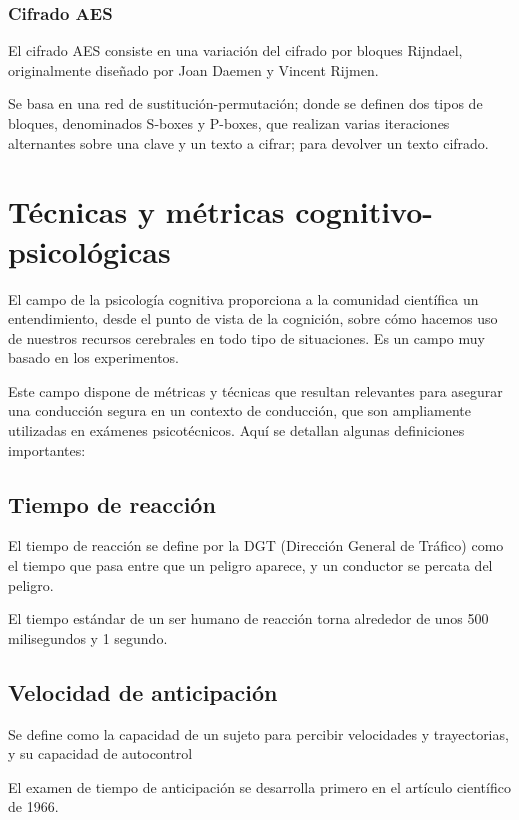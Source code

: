 \documentclass[12pt,a4paper,twoside,openright]{book}
\begin{document}
\subsubsection{Cifrado AES}

El cifrado AES consiste en una variación del cifrado por bloques Rijndael, originalmente diseñado por Joan Daemen y Vincent Rijmen.

Se basa en una red de sustitución-permutación; donde se definen dos tipos de bloques, denominados S-boxes y P-boxes, que realizan varias iteraciones alternantes sobre una clave y un texto a cifrar; para devolver un texto cifrado.

\section{Técnicas y métricas cognitivo-psicológicas}

El campo de la psicología cognitiva proporciona a la comunidad científica un entendimiento, desde el punto de vista de la cognición, sobre cómo hacemos uso de nuestros recursos cerebrales en todo tipo de situaciones. Es un campo muy basado en los experimentos.

Este campo dispone de métricas y técnicas que resultan relevantes para asegurar una conducción segura en un contexto de conducción, que son ampliamente utilizadas en exámenes psicotécnicos. Aquí se detallan algunas definiciones importantes:

\subsection{Tiempo de reacción}

El tiempo de reacción se define por la DGT (Dirección General de Tráfico) como el tiempo que pasa entre que un peligro aparece, y un conductor se percata del peligro. \cite{tiemporeaccion}

El tiempo estándar de un ser humano de reacción torna alrededor de unos 500 milisegundos y 1 segundo. \cite{tiemporeaccion2}

\subsection{Velocidad de anticipación}

Se define como la capacidad de un sujeto para percibir velocidades y trayectorias, y su capacidad de autocontrol \cite{velanticipacion}

El examen de tiempo de anticipación se desarrolla primero en el artículo científico de 1966. \cite{maruyama1966speed}
\end{document}
